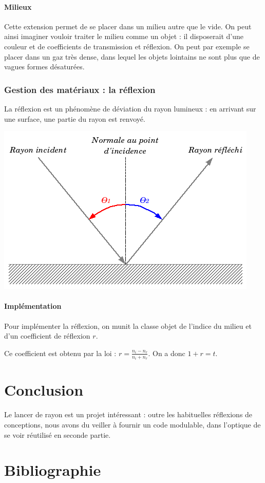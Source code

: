 \documentclass{article}
\begin{document}
\paragraph{Milieux}
Cette extension permet de se placer dans un milieu autre que le vide. On peut
ainsi imaginer vouloir traiter le milieu comme un objet : il disposerait d'une
couleur et de coefficients de transmission et réflexion. On peut par exemple se
placer dans un gaz très dense, dans lequel les objets lointains ne sont plus que
de vagues formes désaturées.

\subsubsection{Gestion des matériaux : la réflexion}
La réflexion est un phénomène de déviation du rayon lumineux : en arrivant
sur une surface, une partie du rayon est renvoyé.

\begin{center}
  \includegraphics[scale=0.5]{img/reflexion.png}
\end{center}

\paragraph{Implémentation}
Pour implémenter la réflexion, on munit la classe objet de l'indice du milieu et
d'un coefficient de réflexion $r$.

Ce coefficient est obtenu par la loi : $r= \frac{n_i - n_r}{n_i + n_r}$. On a
donc $1+r=t$.

\section{Conclusion}
Le lancer de rayon est un projet intéressant : outre les habituelles réflexions
de conceptions, nous avons du veiller à fournir un code modulable, dans 
l'optique de se voir réutilisé en seconde partie.


\appendix
\section{Bibliographie}
\end{document}

